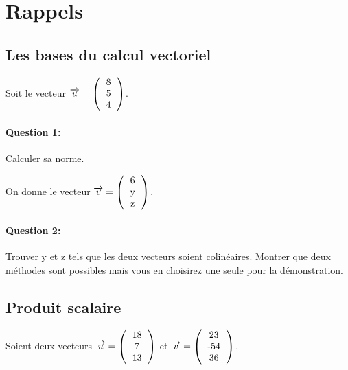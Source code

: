 

\section{Rappels}

\subsection{Les bases du calcul vectoriel}

Soit le vecteur $\overrightarrow{u}=\left(\begin{tabular}{c} 8 \\ 5 \\ 4 \end{tabular}\right)$.

\paragraph{Question 1:} Calculer sa norme.

\vspace{10pt}

On donne le vecteur $\overrightarrow{v}=\left(\begin{tabular}{c} 6 \\ y \\ z \end{tabular}\right)$.

\paragraph{Question 2:} Trouver y et z tels que les deux vecteurs soient colinéaires. Montrer que deux méthodes sont possibles mais vous en choisirez une seule pour la démonstration.

\subsection{Produit scalaire}

Soient deux vecteurs $\overrightarrow{u}=\left(\begin{tabular}{c} 18 \\ 7 \\ 13 \end{tabular}\right)$ et $\overrightarrow{v}=\left(\begin{tabular}{c} 23 \\ -54 \\ 36 \end{tabular}\right)$.


